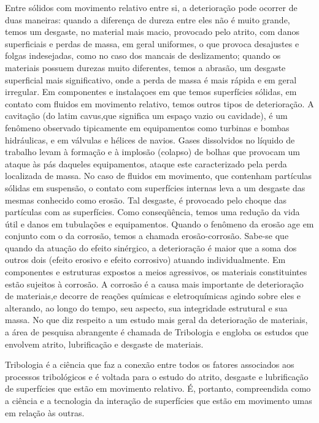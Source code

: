 Entre sólidos com movimento relativo entre si, a deterioração pode ocorrer de
duas maneiras: quando a diferença de dureza entre eles não é muito grande,
temos um desgaste, no material mais macio, provocado pelo atrito, com danos
superficiais e perdas de massa, em geral uniformes, o que provoca desajustes e
folgas indesejadas, como no caso dos mancais de deslizamento; quando os
materiais possuem durezas muito diferentes, temos a abrasão, um desgaste
superficial mais significativo, onde a perda de massa é mais rápida e em geral
irregular. Em componentes e instalaçoes em que temos superfícies sólidas, em
contato com fluidos em movimento relativo, temos outros tipos de deterioração.
A cavitação (do latim cavus,que significa um espaço vazio ou cavidade), é um
fenômeno observado tipicamente em equipamentos como turbinas e bombas
hidráulicas, e em válvulas e hélices de navios. Gases dissolvidos no líquido de
trabalho levam à formação e à implosão (colapso) de bolhas que provocam um
ataque às pás daqueles equipamentos, ataque este caracterizado pela perda
localizada de massa. No caso de fluidos em movimento, que contenham partículas
sólidas em suspensão, o contato com superfícies  internas leva a um desgaste
das mesmas conhecido como erosão. Tal desgaste, é provocado pelo choque das
partículas com as superfícies. Como conseqüência, temos uma redução da vida
útil e danos em tubulações e equipamentos. Quando o fenômeno da erosão age em
conjunto com o da corrosão, temos a chamada erosão-corrosão. Sabe-se que quando
da atuação do efeito sinérgico, a deterioração é maior que a soma dos outros
dois (efeito erosivo e efeito corrosivo) atuando individualmente. Em
componentes e estruturas expostos a meios agressivos, os materiais
constituintes estão sujeitos à corrosão. A corrosão é a causa mais importante
de deterioração de materiais,e decorre de reações químicas e eletroquímicas
agindo sobre eles e alterando, ao longo do tempo, seu aspecto, sua integridade
estrutural e sua massa. No que diz respeito a um estudo mais geral  da
deterioração de materiais, a área de pesquisa abrangente é chamada de
Tribologia e engloba os estudos que envolvem atrito, lubrificação e desgaste de
materiais. 

Tribologia é a ciência que faz a conexão entre todos os fatores associados aos
processos tribológicos e é voltada para o estudo do atrito, desgaste e
lubrificação de superfícies que estão em movimento relativo. É, portanto,
compreendida como a ciência e a tecnologia da interação de superfícies que
estão em movimento umas em relação às outras.

